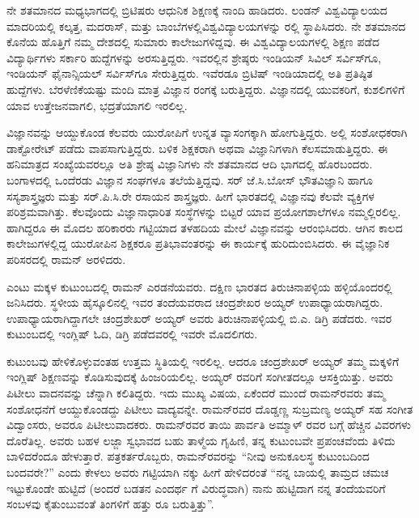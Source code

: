 ನೇ ಶತಮಾನದ ಮಧ್ಯಭಾಗದಲ್ಲಿ ಬ್ರಿಟಿಷರು ಆಧುನಿಕ ಶಿಕ್ಷಣಕ್ಕೆ ನಾಂದಿ ಹಾಡಿದರು. ಲಂಡನ್ ವಿಶ್ವವಿದ್ಯಾಲಯದ ಮಾದರಿಯಲ್ಲಿ ಕಲ್ಕತ್ತ, ಮದರಾಸ್, ಮತ್ತು ಬಾಂಬೆಗಳಲ್ಲಿ\break ವಿಶ್ವವಿದ್ಯಾಲಯಗಳನ್ನು ರಲ್ಲಿ ಸ್ಥಾಪಿಸಿದರು. ನೇ ಶತಮಾನದ ಕೊನೆಯ ಹೊತ್ತಿಗೆ ನಮ್ಮ ದೇಶದಲ್ಲಿ ಸುಮಾರು  ಕಾಲೇಜುಗಳಿದ್ದವು. ಈ ವಿಶ್ವವಿದ್ಯಾಲಯಗಳಲ್ಲಿ ಶಿಕ್ಷಣ ಪಡೆದ ವಿದ್ಯಾರ್ಥಿಗಳು ಸರ್ಕಾರಿ ಹುದ್ದೆಗಳನ್ನು ಅರಸುತ್ತಿದ್ದರು. ಇವರಲ್ಲಿನ ಶ್ರೇಷ್ಠರು ಇಂಡಿಯನ್ ಸಿವಿಲ್ ಸರ್ವಿಸ್‍ಗೂ, ಇಂಡಿಯನ್ ಫೈನಾನ್ಸಿಯಲ್ ಸರ್ವಿಸ್‍ಗೂ ಸೇರುತ್ತಿದ್ದರು. ಇವೆರಡೂ ಬ್ರಿಟಿಷ್ ಇಂಡಿಯಾದಲ್ಲಿ ಅತಿ ಪ್ರತಿಷ್ಠಿತ ಹುದ್ದೆಗಳು. ಬೆರಳೆಣಿಕೆಯಷ್ಟು ಮಂದಿ ಮಾತ್ರ ವಿಜ್ಞಾನ ರಂಗಕ್ಕೆ ಬರುತ್ತಿದ್ದರು. ವಿಜ್ಞಾನದಲ್ಲಿ ಯುವಕರಿಗೆ, ಕುಶಲಿಗಳಿಗೆ ಯಾವ ಉತ್ತೇಜನವಾಗಲಿ, ಭದ್ರತೆಯಾಗಲಿ ಇರಲಿಲ್ಲ.

ವಿಜ್ಞಾನವನ್ನು ಆಯ್ದುಕೊಂಡ ಕೆಲವರು ಯುರೋಪಿಗೆ ಉನ್ನತ ವ್ಯಾಸಂಗಕ್ಕಾಗಿ ಹೋಗುತ್ತಿದ್ದರು. ಅಲ್ಲಿ ಸಂಶೋಧಕರಾಗಿ ಡಾಕ್ಟೋರೇಟ್ ಪಡೆದು ವಾಪಸಾಗುತ್ತಿದ್ದರು. ಬಳಿಕ ಶಿಕ್ಷಕರಾಗಿ ಅಥವಾ ವಿಜ್ಞಾನಿಗಳಾಗಿ ಕೆಲಸಮಾಡುತ್ತಿದ್ದರು. ಈ ಹನಿಮಾತ್ರದ ಸಂಖ್ಯೆಯವರಲ್ಲೂ ಅತಿ ಶ್ರೇಷ್ಠ ವಿಜ್ಞಾನಿಗಳು ನೇ ಶತಮಾನದ ಆದಿ ಭಾಗದಲ್ಲಿ ಹೊರಬಂದರು. ಬಂಗಾಳದಲ್ಲಿ ಒಂದೆರಡು ವಿಜ್ಞಾನ ಸಂಘಗಳೂ ತಲೆಯೆತ್ತಿದ್ದವು. ಸರ್ ಜೆ.ಸಿ.ಬೋಸ್ ಭೌತವಿಜ್ಞಾನಿ ಹಾಗೂ ಸಸ್ಯಶಾಸ್ತ್ರಜ್ಞರು ಮತ್ತು ಸರ್.ಪಿ.ಸಿ.ರೇ ರಸಾಯನ ಶಾಸ್ತ್ರಜ್ಞರು. ಹೀಗೆ ಭಾರತದಲ್ಲಿ ವಿಜ್ಞಾನವು ಕೆಲವೇ ವ್ಯಕ್ತಿಗಳ ಪರಿಶ್ರಮವಾಗಿತ್ತು. ಕೆಲವೊಂದು ವಿಜ್ಞಾನಾಧಾರಿತ ಸಂಸ್ಥೆಗಳನ್ನು ಬಿಟ್ಟರೆ ಯಾವ ಪ್ರಯೋಗಶಾಲೆಗಳೂ ನಮ್ಮಲ್ಲಿರಲಿಲ್ಲ. ಹಾಗಿದ್ದರೂ ಈ ಮೊದಲ ಹರಿಕಾರರು ಗಟ್ಟಿಯಾದ ತಳಹದಿಯ ಮೇಲೆ ವಿಜ್ಞಾನವನ್ನು ಆರಂಭಿಸಿದರು. ಆಗಿನ ಕಾಲದ ಕಾಲೇಜುಗಳಲ್ಲಿದ್ದ ಯುರೋಪಿನ ಶಿಕ್ಷಕರೂ ಪ್ರತಿಭಾವಂತರನ್ನು ಈ ಕಾರ್ಯಕ್ಕೆ ಹುರಿದುಂಬಿಸಿದರು. ಈ ವೈಜ್ಞಾನಿಕ ಪರಿಸರದಲ್ಲಿ ರಾಮನ್ ಅರಳಿದರು.



ಎಂಟು ಮಕ್ಕಳ ಕುಟುಂಬದಲ್ಲಿ ರಾಮನ್ ಎರಡನೆಯವರು. ದಕ್ಷಿಣ ಭಾರತದ ತಿರುಚಿನಾಪಳ್ಳಿಯ ಹಳ್ಳಿಯೊಂದರಲ್ಲಿ ಜನಿಸಿದರು. ಸ್ಥಳೀಯ ಹೈಸ್ಕೂಲಿನಲ್ಲಿ ಇವರ ತಂದೆಯವರಾದ ಚಂದ್ರಶೇಖರ ಅಯ್ಯರ್ ಉಪಾಧ್ಯಾಯರಾಗಿದ್ದರು. ಉಪಾಧ್ಯಾಯರಾಗಿದ್ದಾಗಲೇ ಚಂದ್ರಶೇಖರ್ ಅಯ್ಯರ್ ಅವರು ತಿರುಚಿನಾಪಳ್ಳಿಯಲ್ಲಿ ಬಿ.ಎ. ಡಿಗ್ರಿ ಪಡೆದರು. ಇವರ ಕುಟುಂಬದಲ್ಲಿ ಇಂಗ್ಲಿಷ್ ಓದಿ, ಡಿಗ್ರಿ ಪಡೆದವರಲ್ಲಿ ಇವರೇ ಮೊದಲಿಗರು.

ಕುಟುಂಬವು ಹೇಳಿಕೊಳ್ಳುವಂತಹ ಉತ್ತಮ ಸ್ಥಿತಿಯಲ್ಲಿ ಇರಲಿಲ್ಲ. ಆದರೂ ಚಂದ್ರಶೇಖರ್ ಅಯ್ಯರ್ ತಮ್ಮ ಮಕ್ಕಳಿಗೆ ಇಂಗ್ಲಿಷ್ ಶಿಕ್ಷಣವನ್ನು ಕೊಡಿಸುವುದಕ್ಕೆ ಹಿಂಜರಿಯಲಿಲ್ಲ. ಅಯ್ಯರ್ ರವರಿಗೆ ಸಂಗೀತದಲ್ಲೂ ಆಸಕ್ತಿಯಿತ್ತು. ಅವರು ಪಿಟೀಲು ವಾದನವನ್ನು ಚೆನ್ನಾಗಿ ಕಲಿತಿದ್ದರು. ಇದು ಮುಖ್ಯ ವಿಷಯ, ಏಕೆಂದರೆ ಮುಂದೆ ರಾಮನ್‍ರವರು ತಮ್ಮ ಸಂಶೋಧನೆಗೆ ಆಯ್ದುಕೊಂಡದ್ದು ಪಿಟೀಲು ವಾದ್ಯವನ್ನೇ. ರಾಮನ್‍ರವರ ದೊಡ್ಡಣ್ಣ ಸುಬ್ರಮಣ್ಯ ಅಯ್ಯರ್ ಸಹ ಸಂಗೀತ ವಿದ್ವಾಂಸರು, ಅವರೂ ಪಿಟೀಲುವಾದಕರು. ರಾಮನ್‍ರವರ ತಾಯಿ ಪಾರ್ವತಿ ಅಮ್ಮಾಳ್ ರವರ ಬಗ್ಗೆ ಹೆಚ್ಚಿನ ವಿವರಗಳು ದೊರೆತಿಲ್ಲ. ಅವರು ಬಹಳ ಲಜ್ಜಾ ಸ್ವಭಾವದ ಬಹು ತಾಳ್ಮೆಯ ಗೃಹಿಣಿ, ತನ್ನ ಕುಟುಂಬವೇ ಪ್ರಪಂಚವೆಂದು ತಿಳಿದು ಬಾಳಿದರೆಂದೂ ಹೇಳುತ್ತಾರೆ. ಪತ್ರಕರ್ತರೊಬ್ಬರು, ರಾಮನ್‍ರವರನ್ನು “ನೀವು ಅನುಕೂಲಸ್ಥ ಕುಟುಂಬದಿಂದ ಬಂದವರೇ?” ಎಂದು ಕೇಳಲು ಅವರು ಗಟ್ಟಿಯಾಗಿ ನಕ್ಕು ಹೀಗೆ ಹೇಳಿದರಂತೆ “ನನ್ನ ಬಾಯಲ್ಲಿ ತಾಮ್ರದ ಚಮಚ ಇಟ್ಟುಕೊಂಡೇ ಹುಟ್ಟಿದೆ (ಅಂದರೆ ಬಡತನ ಎಂದರ್ಥ ಗೆ ವಿರುದ್ಧವಾಗಿ) ನಾನು ಹುಟ್ಟಿದಾಗ ನನ್ನ ತಂದೆಯವರಿಗೆ ಸಂಬಳವು ಕೈತುಂಬುವಂತೆ ತಿಂಗಳಿಗೆ ಹತ್ತು ರೂ ಬರುತ್ತಿತ್ತು”.

